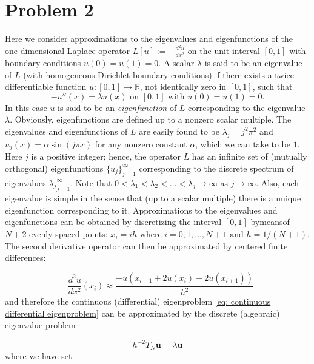 \documentclass[a4paper,11pt]{article}
\newcommand{\R}{\mathbb{R}}
\begin{document}
\section*{Problem 2}	
Here we consider approximations to the eigenvalues and eigenfunctions of the one-dimensional Laplace operator 
$L[u] := - \frac{d^2 u }{dx^2}$ on the unit interval $[0,1]$ with boundary conditions $u(0) = u(1) = 0$. A scalar $\lambda$ is said to be an eigenvalue of $L$ (with homogeneous Dirichlet boundary conditions) if there exists a twice-differentiable function $u : [0, 1] \rightarrow \R$, not identically zero in $[0, 1]$, such that
\begin{equation}\label{eq: continuous differential eigenproblem}
	-u''(x) = \lambda u(x) \text{ on } [0,1] \text{ with } u(0) = u(1) = 0.
\end{equation}
In this case $u$ is said to be an \textit{eigenfunction} of $L$ corresponding to the eigenvalue $\lambda$. Obviously, eigenfunctions are defined up to a nonzero scalar multiple.
The eigenvalues and eigenfunctions of $L$ are easily found to be $\lambda_j = j^2\pi^2$ and $u_j(x) = \alpha \sin(j\pi x)$ for any nonzero constant $\alpha$, which we can take to be $1$. Here $j$ is a positive integer; hence, the operator $L$ has an infinite set of (mutually orthogonal) eigenfunctions $\{u_j\}_{j=1}^\infty $ corresponding to the discrete spectrum of eigenvalues ${\lambda_j}_{j=1}^\infty $. Note that $0 < \lambda_1 < \lambda_2 < \dots < \lambda_j \rightarrow \infty$ as $j \rightarrow \infty$. Also, each eigenvalue is simple in the sense that (up to a scalar multiple) there is a unique eigenfunction corresponding to it. Approximations to the eigenvalues and eigenfunctions can be obtained by discretizing the interval $[0, 1]$ bymeansof $N+2$ evenly spaced points: $x_i =ih \text{ where } i=0,1,...,N+1 \text{ and } h=1/(N+1)$. The second derivative operator can then be approximated by centered finite differences:

\begin{equation}
	-\frac{d^2u}{dx^2}(x_i) \approx \frac{-u(x_{i-1} + 2 u(x_i)  -2 u(x_{i+1}) )}{h^2}
\end{equation}
and therefore the continuous (differential) eigenproblem \eqref{eq: continuous differential eigenproblem} can be approximated by the discrete (algebraic) eigenvalue problem 

\begin{equation}\label{key}
	h^{-2} T_N \textbf{u} = \lambda \textbf{u}
\end{equation}
where we have set
\end{document}
